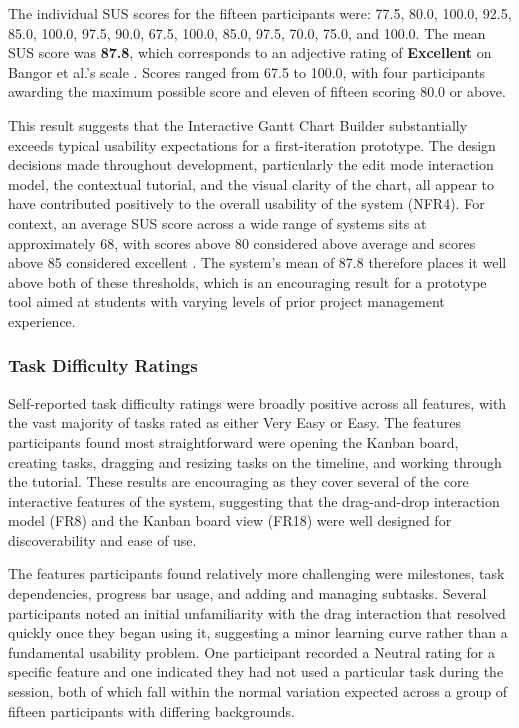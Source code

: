\documentclass[12pt,nonacm,acmlarge,titlepage,screen]{acmart}
\begin{document}
The individual SUS scores for the fifteen participants were: 77.5, 80.0, 100.0, 92.5,
85.0, 100.0, 97.5, 90.0, 67.5, 100.0, 85.0, 97.5, 70.0, 75.0, and 100.0. The mean SUS
score was \textbf{87.8}, which corresponds to an adjective rating of \textbf{Excellent}
on Bangor et al.'s scale \cite{bangor_sus_2009}. Scores ranged from 67.5 to
100.0, with four participants awarding the maximum possible score and eleven of fifteen
scoring 80.0 or above.

This result suggests that the Interactive Gantt Chart Builder substantially exceeds
typical usability expectations for a first-iteration prototype. The design decisions
made throughout development, particularly the edit mode interaction model, the
contextual tutorial, and the visual clarity of the chart, all appear to have contributed
positively to the overall usability of the system (NFR4). For context, an average SUS
score across a wide range of systems sits at approximately 68, with scores above 80
considered above average and scores above 85 considered excellent
\cite{bangor_sus_2009}\cite{SAURO2012185}. The system's mean of 87.8 therefore places
it well above both of these thresholds, which is an encouraging result for a prototype
tool aimed at students with varying levels of prior project management experience.

\subsubsection{Task Difficulty Ratings}

Self-reported task difficulty ratings were broadly positive across all features,
with the vast majority of tasks rated as either Very Easy or Easy. The features
participants found most straightforward were opening the Kanban board, creating
tasks, dragging and resizing tasks on the timeline, and working through the
tutorial. These results are encouraging as they cover several of the core
interactive features of the system, suggesting that the drag-and-drop interaction
model (FR8) and the Kanban board view (FR18) were well designed for discoverability
and ease of use.

The features participants found relatively more challenging were milestones, task
dependencies, progress bar usage, and adding and managing subtasks. Several
participants noted an initial unfamiliarity with the drag interaction that resolved
quickly once they began using it, suggesting a minor learning curve rather than a
fundamental usability problem. One participant recorded a Neutral rating for a
specific feature and one indicated they had not used a particular task during the
session, both of which fall within the normal variation expected across a group of
fifteen participants with differing backgrounds.
\end{document}
